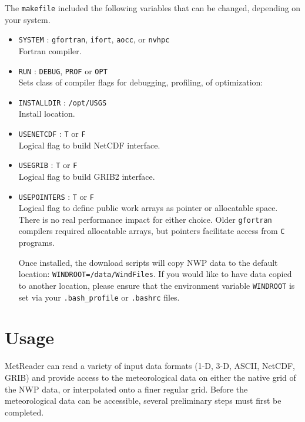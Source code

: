 \documentclass[11pt]{article}   %
\begin{document}
The \texttt{makefile} included the following variables that can be changed, depending on your
system.
\begin{itemize}
\item \texttt{SYSTEM} : \texttt{gfortran}, \texttt{ifort}, \texttt{aocc}, or \texttt{nvhpc}\\
Fortran compiler.
\item \texttt{RUN} : \texttt{DEBUG}, \texttt{PROF} or \texttt{OPT}\\
Sets class of compiler flags for debugging, profiling, of optimization:
\item \texttt{INSTALLDIR} : \texttt{/opt/USGS} \\
Install location.
\item \texttt{USENETCDF} : \texttt{T} or \texttt{F}\\
Logical flag to build NetCDF interface.
\item \texttt{USEGRIB} : \texttt{T} or \texttt{F}\\
Logical flag to build GRIB2 interface.
\item \texttt{USEPOINTERS} : \texttt{T} or \texttt{F}\\
Logical flag to define public work arrays as pointer or allocatable space. There is no
real performance impact for either choice. Older \texttt{gfortran} compilers
required allocatable arrays, but pointers facilitate access from \texttt{C} programs.

Once installed, the download scripts will copy NWP data to the default location:
\texttt{WINDROOT=/data/WindFiles}.  If you would like to have data copied to another
location, please ensure that the environment variable \texttt{WINDROOT} is set via
your \texttt{.bash\_profile} or \texttt{.bashrc} files.
\end{itemize}

\clearpage
\section{Usage}
MetReader can read a variety of input data formats (1-D, 3-D, ASCII, NetCDF, GRIB) and
provide access to the meteorological data on either the native grid of the NWP data, or interpolated
onto a finer regular grid.  Before the meteorological data can be accessible, several preliminary steps
must first be completed.
\end{document}

